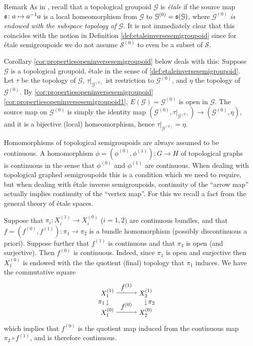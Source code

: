 \begin{denv*}{Remark}
As in \cite{MR2304314}, recall that a topological groupoid $\mathcal{G}$ is \emph{étale} if the source map $\operatorname{\mathfrak{s}}\colon a\mapsto a^{-1}a$ is a local homeomorphism from $\mathcal{G}$ to $\mathcal{G}^{(0)}=\operatorname{\mathfrak{s}}(\mathcal{G})$, where \emph{$\mathcal{G}^{(0)}$ is endowed with the subspace topology of $\mathcal{G}$}. It is not immediately clear that this coincides with the notion in Definition \ref{def:etaleinversesemigroupoid} since for étale semigroupoids we do not assume $\mathcal{S}^{(0)}$ to even be a subset of $\mathcal{S}$.

Corollary \ref{cor:propertiesopeninversesemigroupoid} below deals with this: Suppose $\mathcal{G}$ is a topological groupoid, étale in the sense of \ref{def:etaleinversesemigroupoid}. Let $\tau$ be the topology of $\mathcal{G}$, $\tau|_{\mathcal{G}^{(0)}}$ ist restriction to $\mathcal{G}^{(0)}$, and $\eta$ the topology of $\mathcal{G}^{(0)}$. By \ref{cor:propertiesopeninversesemigroupoid}\ref{cor:propertiesopeninversesemigroupoid1}, $E(\mathcal{G})=\mathcal{G}^{(0)}$ is open in $\mathcal{G}$. The source map on $\mathcal{G}^{(0)}$ is simply the identity map $(\mathcal{G}^{(0)},\tau|_{\mathcal{G}^{(0)}})\to(\mathcal{G}^{(0)},\eta)$, and it is a bijective (local) homeomorphism, hence $\tau|_{\mathcal{G}^{(0)}}=\eta$.
\end{denv*}

Homomorphisms of topological semigroupoids are always assumed to be continuous. A homomorphism $\phi=(\phi^{(0)},\phi^{(1)})\colon G\to H$ of topological graphs is continuous in the sense that $\phi^{(0)}$ and $\phi^{(1)}$ are continuous. When dealing with topological graphed semigroupoids this is a condition which we need to require, but when dealing with étale inverse semigroupoids, continuity of the ``arrow map'' actually implies continuity of the ``vertex map''. For this we recall a fact from the general theory of étale spaces.

Suppose that $\pi_i\colon X_i^{(1)}\to X_i^{(0)}$ ($i=1,2$) are continuous bundles,  and that $f=(f^{(0)},f^{(1)})\colon\pi_1\to\pi_2$ is a bundle homomorphism (possibly discontinuous a priori). Suppose further that $f^{(1)}$ is continuous and that $\pi_1$ is open (and surjective). Then $f^{(0)}$ is continuous. Indeed, since $\pi_1$ is open and surjective then $X_1^{(0)}$ is endowed with the the quotient (final) topology that $\pi_1$ induces. We have the commutative square
\[\begin{tikzpicture}
\node (X11) at (0,0) {$X_1^{(1)}$};
\node (X10) at ([shift={+(0,-1)}]X11) {$X_1^{(0)}$};
\node (X21) at ([shift={+(2,0)}]X11) {$X_2^{(1)}$};
\node (X20) at ([shift={+(0,-1)}]X21) {$X_2^{(0)}$};
\draw[->] (X11)--(X21) node[midway,above] {$f^{(1)}$};
\draw[->] (X11)--(X10) node[midway,left] {$\pi_1$};
\draw[->] (X21)--(X20) node[midway,right] {$\pi_2$};
\draw[->] (X10)--(X20) node[midway,above] {$f^{(0)}$};
\end{tikzpicture}\]
which implies that $f^{(0)}$ is the quotient map induced from the continuous map $\pi_2\circ f^{(1)}$, and is therefore continuous.

